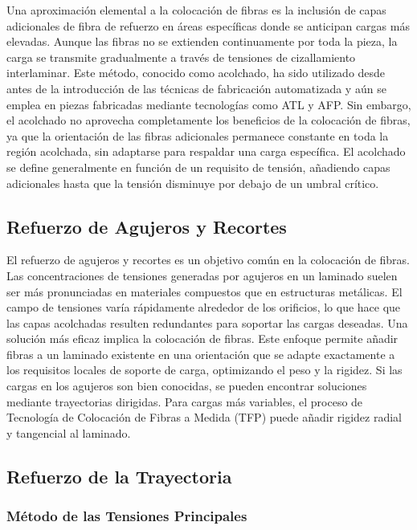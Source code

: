\begin{enumerate}[label=\arabic*.]
Una aproximación elemental a la colocación de fibras es la inclusión de capas adicionales de fibra de refuerzo en áreas específicas donde se anticipan cargas más elevadas. Aunque las fibras no se extienden continuamente por toda la pieza, la carga se transmite gradualmente a través de tensiones de cizallamiento interlaminar. Este método, conocido como acolchado, ha sido utilizado desde antes de la introducción de las técnicas de fabricación automatizada y aún se emplea en piezas fabricadas mediante tecnologías como ATL y AFP. Sin embargo, el acolchado no aprovecha completamente los beneficios de la colocación de fibras, ya que la orientación de las fibras adicionales permanece constante en toda la región acolchada, sin adaptarse para respaldar una carga específica. El acolchado se define generalmente en función de un requisito de tensión, añadiendo capas adicionales hasta que la tensión disminuye por debajo de un umbral crítico.

\subsection{Refuerzo de Agujeros y Recortes}

El refuerzo de agujeros y recortes es un objetivo común en la colocación de fibras. Las concentraciones de tensiones generadas por agujeros en un laminado suelen ser más pronunciadas en materiales compuestos que en estructuras metálicas. El campo de tensiones varía rápidamente alrededor de los orificios, lo que hace que las capas acolchadas resulten redundantes para soportar las cargas deseadas. Una solución más eficaz implica la colocación de fibras. Este enfoque permite añadir fibras a un laminado existente en una orientación que se adapte exactamente a los requisitos locales de soporte de carga, optimizando el peso y la rigidez. Si las cargas en los agujeros son bien conocidas, se pueden encontrar soluciones mediante trayectorias dirigidas. Para cargas más variables, el proceso de Tecnología de Colocación de Fibras a Medida (TFP) puede añadir rigidez radial y tangencial al laminado.

\subsection{Refuerzo de la Trayectoria}

\subsubsection{Método de las Tensiones Principales}


\end{enumerate}
